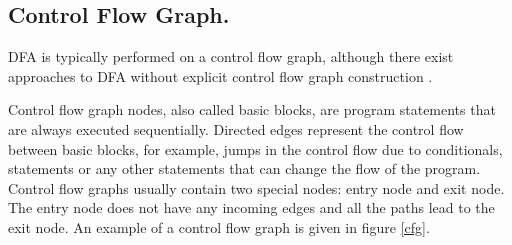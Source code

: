         
        \subsection{Control Flow Graph.} 
        DFA is typically performed on a control flow graph, 
        although there exist approaches to DFA 
        without explicit control flow graph 
        construction \cite{mohnen2002graph}.
        
        Control flow graph nodes, also called basic blocks, 
        are program statements that are always executed sequentially. 
        Directed edges represent the control flow between basic blocks, 
        for example, jumps in the control flow due to conditionals, 
         statements or any other statements that can change 
        the flow of the program.        
        Control flow graphs usually contain two special nodes: 
        entry node and exit node. The entry node does not have any 
        incoming edges and all the paths lead to the exit node.        
        An example of a control flow graph is given in figure \ref{cfg}.
        
